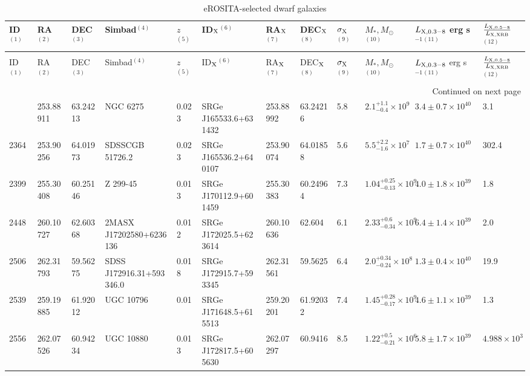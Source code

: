 \begin{longtable}{llllllllllll}
\caption{eROSITA-detected dwarf galaxies} \label{tab:dwarfs} \\
\toprule
ID$^{(1)}$ & RA$^{(2)}$ & DEC$^{(3)}$ & Simbad$^{(4)}$ & $z$$^{(5)}$ & ID$_{\rm X}$$^{(6)}$ & RA$_{\rm X}$$^{(7)}$ & DEC$_{\rm X}$$^{(8)}$ & $\sigma_{\rm X}$$^{(9)}$ & $M_*, M_{\odot}$$^{(10)}$ & $L_{\rm X, 0.3-8}$ erg s$^{-1}$$^{(11)}$ & $\frac{L_{\rm X, 0.5-8}}{L_{\rm X, XRB}}$$^{(12)}$ \\
\midrule
\endfirsthead
\caption[]{eROSITA-selected dwarf galaxies} \\
\toprule
ID$^{(1)}$ & RA$^{(2)}$ & DEC$^{(3)}$ & Simbad$^{(4)}$ & $z$$^{(5)}$ & ID$_{\rm X}$$^{(6)}$ & RA$_{\rm X}$$^{(7)}$ & DEC$_{\rm X}$$^{(8)}$ & $\sigma_{\rm X}$$^{(9)}$ & $M_*, M_{\odot}$$^{(10)}$ & $L_{\rm X, 0.3-8}$ erg s$^{-1}$$^{(11)}$ & $\frac{L_{\rm X, 0.5-8}}{L_{\rm X, XRB}}$$^{(12)}$ \\
\midrule
\endhead
\midrule
\multicolumn{12}{r}{Continued on next page} \\
\midrule
\endfoot
\bottomrule
\endlastfoot
2349 & 253.88911 & 63.24213 & NGC  6275 & 0.023 & SRGe J165533.6+631432 & 253.88992 & 63.24216 & 5.8 & $2.1^{+1.1}_{-0.4}\times10^{9}$ & $3.4\pm0.7\times10^{40}$ & 3.1 \\
2364 & 253.90256 & 64.01973 & SDSSCGB 51726.2 & 0.023 & SRGe J165536.2+640107 & 253.90074 & 64.01858 & 5.6 & $5.5^{+2.2}_{-1.6}\times10^{7}$ & $1.7\pm0.7\times10^{40}$ & 302.4 \\
2399 & 255.30408 & 60.25146 & Z 299-45 & 0.013 & SRGe J170112.9+601459 & 255.30383 & 60.24964 & 7.3 & $1.04^{+0.25}_{-0.13}\times10^{9}$ & $4.0\pm1.8\times10^{39}$ & 1.8 \\
2448 & 260.10727 & 62.60368 & 2MASX J17202580+6236136 & 0.012 & SRGe J172025.5+623614 & 260.10636 & 62.604 & 6.1 & $2.33^{+0.6}_{-0.34}\times10^{9}$ & $6.4\pm1.4\times10^{39}$ & 2.0 \\
2506 & 262.31793 & 59.56275 & SDSS J172916.31+593346.0 & 0.018 & SRGe J172915.7+593345 & 262.31561 & 59.5625 & 6.4 & $2.0^{+0.34}_{-0.24}\times10^{8}$ & $1.3\pm0.4\times10^{40}$ & 19.9 \\
2539 & 259.19885 & 61.92012 & UGC 10796 & 0.01 & SRGe J171648.5+615513 & 259.20201 & 61.92032 & 7.4 & $1.45^{+0.28}_{-0.17}\times10^{9}$ & $4.6\pm1.1\times10^{39}$ & 1.3 \\
2556 & 262.07526 & 60.94234 & UGC 10880 & 0.013 & SRGe J172817.5+605630 & 262.07297 & 60.9416 & 8.5 & $1.22^{+0.5}_{-0.21}\times10^{6}$ & $5.8\pm1.7\times10^{39}$ & $4.988\times10^{3}$ \\

\end{longtable}
